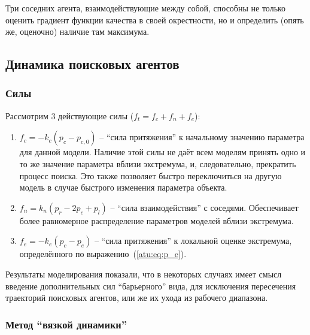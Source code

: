 Три соседних агента, взаимодействующие между собой,
способны не только оценить градиент функции качества в своей окрестности,
но и определить (опять же, оценочно) наличие там максимума.



\subsection{Динамика поисковых агентов}  %


\subsubsection{Силы}  %

Рассмотрим 3 действующие силы
($ f_t = f_c + f_n + f_e $):

\begin{enumerate}
  \item
    $f_c = -k_c (p_c - p_{c,0}) $ -- ``сила притяжения'' к начальному значению
    параметра
    для данной модели. Наличие этой силы не даёт всем моделям принять одно
    и то же значение параметра вблизи экстремума, и, следовательно,
    прекратить процесс поиска. Это также позволяет быстро переключиться
    на другую модель в случае быстрого изменения параметра объекта.

  \item
    $f_n = k_n ( p_r - 2 p_c + p_l ) $ -- ``сила взаимодействия''
    с соседями. Обеспечивает более равномерное распределение
    параметров моделей вблизи экстремума.

  \item
    $f_e = - k_e ( p_c - p_e ) $ -- ``сила притяжения'' к локальной
    оценке экстремума, определённого по выражению~(\ref{atu:eq:p_e}).

\end{enumerate}

Результаты моделирования показали, что в некоторых случаях
имеет смысл введение дополнительных сил ``барьерного'' вида,
для исключения пересечения траекторий поисковых агентов, или же их ухода из рабочего диапазона.




\subsubsection{Метод ``вязкой динамики''}  %


